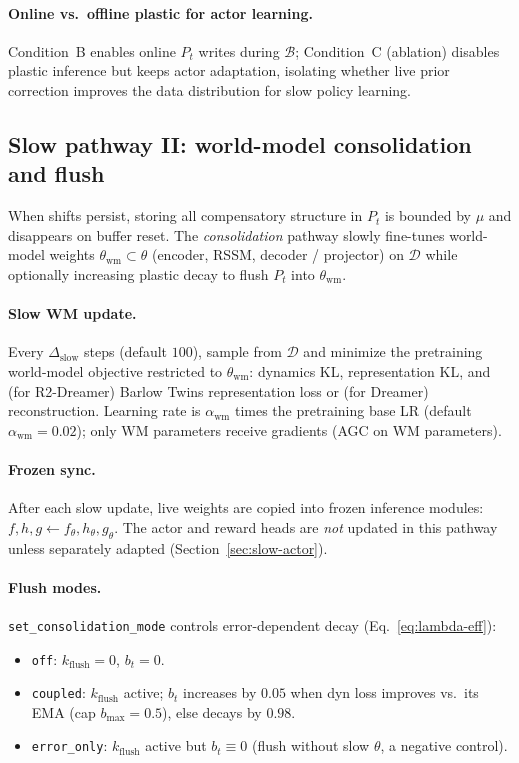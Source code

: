 \paragraph{Online vs.\ offline plastic for actor learning.}
Condition~B enables online $P_t$ writes during $\mathcal{B}$; Condition~C (ablation) disables plastic inference but keeps actor adaptation, isolating whether live prior correction improves the data distribution for slow policy learning.

\subsection{Slow pathway II: world-model consolidation and flush}
\label{sec:consolidation}

When shifts persist, storing all compensatory structure in $P_t$ is bounded by $\mu$ and disappears on buffer reset.
The \emph{consolidation} pathway slowly fine-tunes world-model weights $\theta_{\mathrm{wm}} \subset \theta$ (encoder, RSSM, decoder / projector) on $\mathcal{D}$ while optionally increasing plastic decay to flush $P_t$ into $\theta_{\mathrm{wm}}$.

\paragraph{Slow WM update.}
Every $\Delta_{\mathrm{slow}}$ steps (default $100$), sample from $\mathcal{D}$ and minimize the pretraining world-model objective restricted to $\theta_{\mathrm{wm}}$:
dynamics KL, representation KL, and (for R2-Dreamer) Barlow Twins representation loss or (for Dreamer) reconstruction.
Learning rate is $\alpha_{\mathrm{wm}}$ times the pretraining base LR (default $\alpha_{\mathrm{wm}}=0.02$); only WM parameters receive gradients (AGC on WM parameters).

\paragraph{Frozen sync.}
After each slow update, live weights are copied into frozen inference modules:
$f, h, g \leftarrow f_\theta, h_\theta, g_\theta$.
The actor and reward heads are \emph{not} updated in this pathway unless separately adapted (Section~\ref{sec:slow-actor}).

\paragraph{Flush modes.}
\texttt{set\_consolidation\_mode} controls error-dependent decay (Eq.~\eqref{eq:lambda-eff}):
\begin{itemize}[leftmargin=*, itemsep=1pt]
  \item \texttt{off}: $k_{\mathrm{flush}}=0$, $b_t=0$.
  \item \texttt{coupled}: $k_{\mathrm{flush}}$ active; $b_t$ increases by $0.05$ when dyn loss improves vs.\ its EMA (cap $b_{\max}=0.5$), else decays by $0.98$.
  \item \texttt{error\_only}: $k_{\mathrm{flush}}$ active but $b_t \equiv 0$ (flush without slow $\theta$, a negative control).
\end{itemize}

